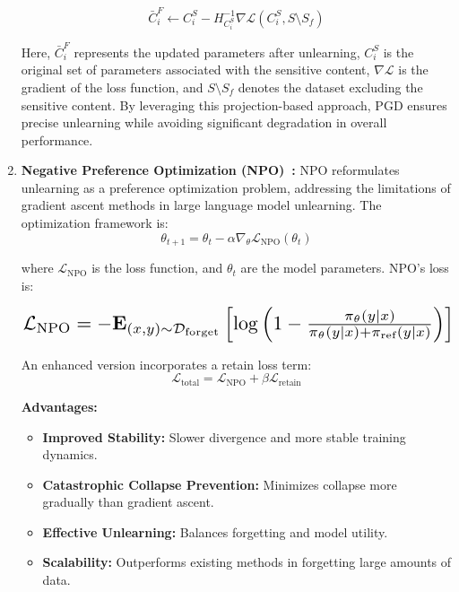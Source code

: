 \documentclass[11pt]{article}
\begin{document}
\begin{enumerate}
        \begin{equation}
            \bar{C}_i^F \leftarrow C_i^S - H_{C_i^S}^{-1} \nabla \mathcal{L}(C_i^S, S \setminus S_f)
        \end{equation}

        Here, \( \bar{C}_i^F \) represents the updated parameters after unlearning, \( C_i^S \) is the original set of parameters associated with the sensitive content, \( \nabla \mathcal{L} \) is the gradient of the loss function, and \( S \setminus S_f \) denotes the dataset excluding the sensitive content. By leveraging this projection-based approach, PGD ensures precise unlearning while avoiding significant degradation in overall performance.

        \item \textbf{Negative Preference Optimization (NPO)~\cite{zhang2024negative}:}
        NPO reformulates unlearning as a preference optimization problem, addressing the limitations of gradient ascent methods in large language model unlearning. The optimization framework is:
        \vspace{-3pt}
        \[
            \theta_{t+1} = \theta_t - \alpha \nabla_{\theta} \mathcal{L}_{\text{NPO}}(\theta_t)
        \]

        where $\mathcal{L}_{\text{NPO}}$ is the loss function, and $\theta_t$ are the model parameters. NPO's loss is:

        \[
            \resizebox{\columnwidth}{!}{$\mathcal{L}_{\text{NPO}} = -\mathbf{E}_{(x,y) \sim \mathcal{D}_{\text{forget}}} \left[ \log \left(1 - \frac{\pi_\theta(y|x)}{\pi_\theta(y|x) + \pi_{\text{ref}}(y|x)} \right) \right]$}
        \]


        An enhanced version incorporates a retain loss term:
        \vspace{-3pt}
        \[
            \mathcal{L}_{\text{total}} = \mathcal{L}_{\text{NPO}} + \beta \mathcal{L}_{\text{retain}}
        \]

        \textbf{Advantages:}
        \begin{itemize}
            \item \textbf{Improved Stability:} Slower divergence and more stable training dynamics.
            \item \textbf{Catastrophic Collapse Prevention:} Minimizes collapse more gradually than gradient ascent.
            \item \textbf{Effective Unlearning:} Balances forgetting and model utility.
            \item \textbf{Scalability:} Outperforms existing methods in forgetting large amounts of data.
        \end{itemize}


\end{enumerate}
\end{document}
